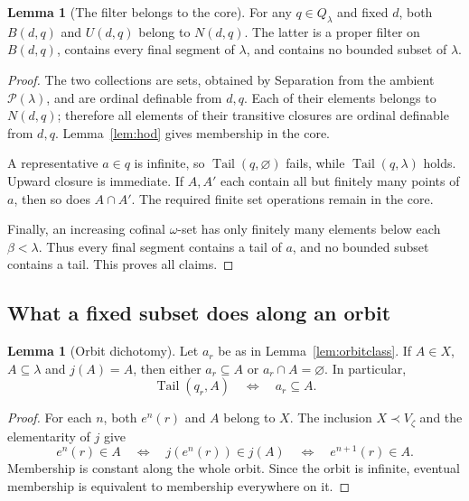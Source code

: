 \documentclass[11pt,letterpaper]{article}
\theoremstyle{definition}
\newtheorem{lemma}[definition]{Lemma}
\newcommand{\Pow}{\mathcal P}
\newcommand{\tail}{\operatorname{Tail}}
\begin{document}
\begin{lemma}[The filter belongs to the core]\label{lem:ownership}
For any $q\in Q_\lambda$ and fixed $d$, both $B(d,q)$ and $U(d,q)$ belong to $N(d,q)$. The latter is a proper filter on $B(d,q)$, contains every final segment of $\lambda$, and contains no bounded subset of $\lambda$.
\end{lemma}

\begin{proof}
The two collections are sets, obtained by Separation from the ambient $\Pow(\lambda)$, and are ordinal definable from $d,q$. Each of their elements belongs to $N(d,q)$; therefore all elements of their transitive closures are ordinal definable from $d,q$. Lemma~\ref{lem:hod} gives membership in the core.

A representative $a\in q$ is infinite, so $\tail(q,\varnothing)$ fails, while $\tail(q,\lambda)$ holds. Upward closure is immediate. If $A,A'$ each contain all but finitely many points of $a$, then so does $A\cap A'$. The required finite set operations remain in the core.

Finally, an increasing cofinal $\omega$-set has only finitely many elements below each $\beta<\lambda$. Thus every final segment contains a tail of $a$, and no bounded subset contains a tail. This proves all claims.
\end{proof}

\subsection{What a fixed subset does along an orbit}

\begin{lemma}[Orbit dichotomy]\label{lem:fixedsubset}
Let $a_r$ be as in Lemma~\ref{lem:orbitclass}. If $A\in X$, $A\subseteq\lambda$ and $j(A)=A$, then either $a_r\subseteq A$ or $a_r\cap A=\varnothing$. In particular,
\[
                  \tail(q_r,A)\quad\Longleftrightarrow\quad a_r\subseteq A.
\]
\end{lemma}

\begin{proof}
For each $n$, both $e^n(r)$ and $A$ belong to $X$. The inclusion $X\prec V_\zeta$ and the elementarity of $j$ give
\[
 e^n(r)\in A
   \quad\Longleftrightarrow\quad
 j(e^n(r))\in j(A)
   \quad\Longleftrightarrow\quad e^{n+1}(r)\in A.
\]
Membership is constant along the whole orbit. Since the orbit is infinite, eventual membership is equivalent to membership everywhere on it.
\end{proof}
\end{document}
